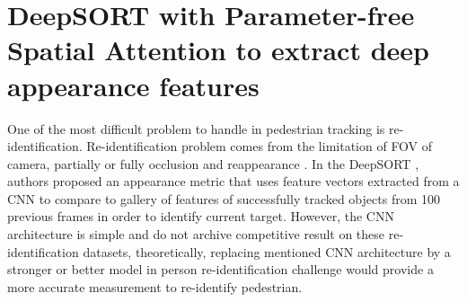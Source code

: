 \section{DeepSORT with Parameter-free Spatial Attention to extract deep appearance features}
\hspace{0.5cm} One of the most difficult problem to handle in pedestrian tracking is re-identification. Re-identification problem comes from the limitation of
\acrshort{FOV} of camera, partially or fully occlusion and
reappearance . In the DeepSORT \cite{Wojke2017simple}, authors proposed an
appearance metric that uses feature vectors extracted from a \acrshort{CNN} to compare to
gallery of features of successfully tracked objects from 100 previous
frames in order to identify current target. However, the \acrshort{CNN} architecture is simple and do not archive competitive result on these
re-identification datasets, theoretically, replacing mentioned \acrshort{CNN}
architecture by a stronger or better model in person re-identification
challenge would provide a more accurate measurement to re-identify pedestrian.\par

